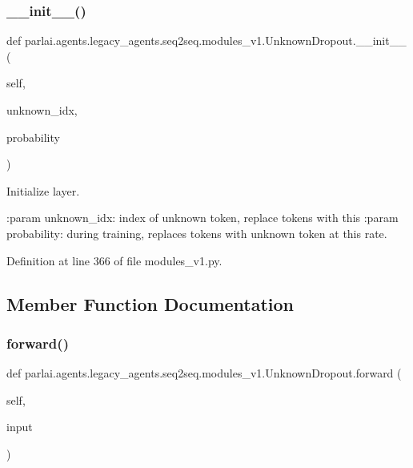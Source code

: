 \subsubsection{\texorpdfstring{\+\_\+\+\_\+init\+\_\+\+\_\+()}{\_\_init\_\_()}}
{\footnotesize\ttfamily def parlai.\+agents.\+legacy\+\_\+agents.\+seq2seq.\+modules\+\_\+v1.\+Unknown\+Dropout.\+\_\+\+\_\+init\+\_\+\+\_\+ (\begin{DoxyParamCaption}\item[{}]{self,  }\item[{}]{unknown\+\_\+idx,  }\item[{}]{probability }\end{DoxyParamCaption})}

\begin{DoxyVerb}Initialize layer.

:param unknown_idx: index of unknown token, replace tokens with this
:param probability: during training, replaces tokens with unknown token
            at this rate.
\end{DoxyVerb}
 

Definition at line 366 of file modules\+\_\+v1.\+py.



\subsection{Member Function Documentation}
\mbox{\label{classparlai_1_1agents_1_1legacy__agents_1_1seq2seq_1_1modules__v1_1_1UnknownDropout_a4527e73a4211e888db806e4526c0126e}} 
\subsubsection{\texorpdfstring{forward()}{forward()}}
{\footnotesize\ttfamily def parlai.\+agents.\+legacy\+\_\+agents.\+seq2seq.\+modules\+\_\+v1.\+Unknown\+Dropout.\+forward (\begin{DoxyParamCaption}\item[{}]{self,  }\item[{}]{input }\end{DoxyParamCaption})}

